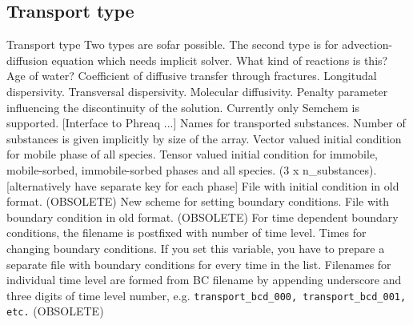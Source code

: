 \subsection{Transport type}
\begin{recordtype}{Transport type}{}
    Two types are sofar possible. The second type is for advection-diffusion equation which needs implicit solver.
 What kind of reactions is this? Age of water?
  Coefficient of diffusive transfer through fractures.
  Longitudal dispersivity.
  Transversal dispersivity.
  Molecular diffusivity.
  Penalty parameter influencing the discontinuity of the solution.
 Currently only Semchem is supported. [Interface to Phreaq ...]
 Names for transported substances. Number of substances is given implicitly by size of the array.
 Vector valued initial condition for mobile phase of all species. 
 Tensor valued initial condition for immobile, mobile-sorbed, immobile-sorbed phases and all species. (3 x n\_substances).
 [alternatively have separate key for each phase]
 File with initial condition in old format. (OBSOLETE)
 New scheme for setting boundary conditions.
 File with boundary condition in old format. (OBSOLETE)
 For time dependent boundary conditions, the filename is postfixed with 
 number of time level.
  Times for changing boundary conditions. If you set this variable, you have to prepare a separate file with boundary conditions for every 
  time in the list. Filenames for individual time level are formed from BC filename by appending underscore and three digits of time level number, e.g. 
  {\tt transport\_bcd\_000, transport\_bcd\_001, etc.} (OBSOLETE)

\end{recordtype}

